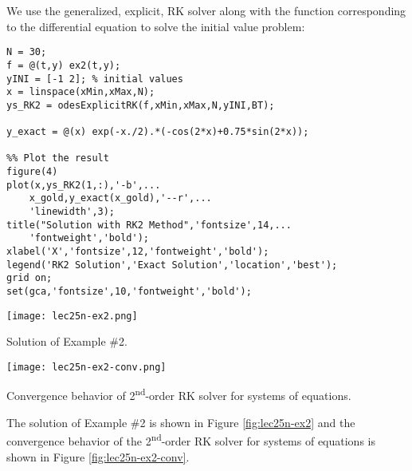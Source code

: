 \noindent We use the generalized, explicit, RK solver along with the function corresponding to the differential equation to solve the initial value problem:

\begin{lstlisting}[style=myMatlab,name=lec25n-7]
%% Generalize for System of ODEs
N = 30;
f = @(t,y) ex2(t,y);
yINI = [-1 2]; % initial values
x = linspace(xMin,xMax,N);
ys_RK2 = odesExplicitRK(f,xMin,xMax,N,yINI,BT); 

y_exact = @(x) exp(-x./2).*(-cos(2*x)+0.75*sin(2*x));

%% Plot the result
figure(4)
plot(x,ys_RK2(1,:),'-b',...
    x_gold,y_exact(x_gold),'--r',...
    'linewidth',3);
title("Solution with RK2 Method",'fontsize',14,...
    'fontweight','bold');
xlabel('X','fontsize',12,'fontweight','bold');
legend('RK2 Solution','Exact Solution','location','best');
grid on;
set(gca,'fontsize',10,'fontweight','bold');
\end{lstlisting}
\begin{marginfigure}
\texttt{[image: lec25n-ex2.png]}
\caption{Solution of Example \#2.}
\label{fig:lec25n-ex2}
\end{marginfigure}
\begin{marginfigure}
\texttt{[image: lec25n-ex2-conv.png]}
\caption{Convergence behavior of 2\textsuperscript{nd}-order RK solver for systems of equations.}
\label{fig:lec25n-ex2-conv}
\end{marginfigure}
The solution of Example \#2 is shown in Figure \ref{fig:lec25n-ex2} and the convergence behavior of the 2\textsuperscript{nd}-order RK solver for systems of equations is shown in Figure \ref{fig:lec25n-ex2-conv}.




